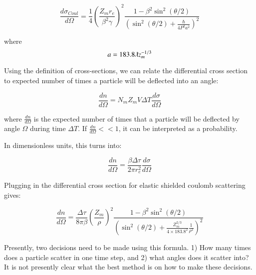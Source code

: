 \documentclass[]{article}
\begin{document}
\begin{equation} 
\frac{d\sigma_{Coul}}{d \Omega} = \frac{1}{4}\left(  \frac{Z_m r_e }{\beta^2 \gamma }  \right)^2\frac{1-\beta^2\sin^2(\theta/2)}{ \left(  \sin^2(\theta/2) + \frac{\hbar}{4P^2a^2}  \right)^2 }
\end{equation}

where
\begin{equation} 
a=183.8 \lambdabar z_m^{-1/3}
\end{equation}

Using the definition of cross-sections, we can relate the differential cross section to expected number of times a particle will be deflected into an angle:

\begin{equation} 
\frac{dn}{d \Omega} =N_m Z_m V \Delta T \frac{d \sigma}{d \Omega}
\end{equation}

where $\frac{dn}{d \Omega}$ is the expected number of times that a particle will be deflected by angle $\Omega$ during time $\Delta T$. If $\frac{dn}{d \Omega} << 1$, it can be interpreted as a probability. 

In dimensionless units, this turns into:

\begin{equation} 
\frac{dn}{d \Omega} =\frac{ \beta \Delta \tau }{2 \pi r_e^2} \frac{d \sigma}{d \Omega}
\end{equation}

Plugging in the differential cross section for elastic shielded coulomb scattering gives:

\begin{equation} 
\frac{dn}{d \Omega} =\frac{ \Delta \tau }{8 \pi \beta }\left( \frac{Z_m}{\rho} \right)^2  \frac{1-\beta^2\sin^2(\theta/2)}{ \left(  \sin^2(\theta/2) + \frac{Z_m^{2/3}}{4\times 183.8^2} \frac{1}{\rho^2} \right)^2 }
\end{equation}

Presently, two decisions need to be made using this formula. 1) How many times does a particle scatter in one time step, and 2) what angles does it scatter into?  It is not presently clear what the best method is on how to make these decisions.
\end{document}
